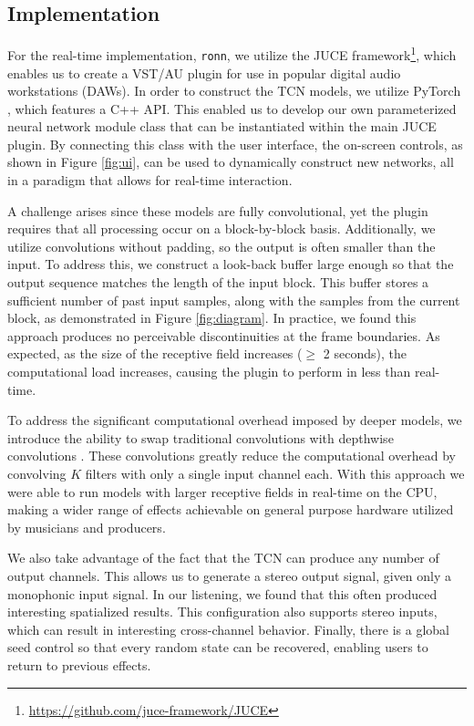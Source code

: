 \documentclass{article}
\begin{document}
\subsection{Implementation}
For the real-time implementation, \texttt{ronn}, we utilize the JUCE framework\footnote{\url{https://github.com/juce-framework/JUCE}},
which enables us to create a VST/AU plugin for use in popular digital audio workstations (DAWs).
In order to construct the TCN models, we utilize PyTorch \cite{pytorch}, which features a C++ API. 
This enabled us to develop our own parameterized neural network module class that can be instantiated within the main JUCE plugin.
By connecting this class with the user interface, the on-screen controls, as shown in Figure \ref{fig:ui},
can be used to dynamically construct new networks, all in a paradigm that allows for real-time interaction. 

A challenge arises since these models are fully convolutional,
yet the plugin requires that all processing occur on a block-by-block basis. 
Additionally, we utilize convolutions without padding, so the output is often smaller than the input. 
To address this, we construct a look-back buffer large enough so that the output sequence matches the length of the input block. 
This buffer stores a sufficient number of past input samples, along with the samples from the current block, as demonstrated in Figure \ref{fig:diagram}. 
In practice, we found this approach produces no perceivable discontinuities at the frame boundaries. 
As expected, as the size of the receptive field increases ($\geq$ 2 seconds), the computational load increases, 
causing the plugin to perform in less than real-time.

To address the significant computational overhead imposed by deeper models, 
we introduce the ability to swap traditional convolutions with depthwise convolutions \cite{howard2017mobilenets}.
These convolutions greatly reduce the computational overhead by convolving $K$ filters with only a single input channel each. 
With this approach we were able to run models with larger receptive fields in real-time on the CPU,
making a wider range of effects achievable on general purpose hardware utilized by musicians and producers. 

We also take advantage of the fact that the TCN can produce any number of output channels. 
This allows us to generate a stereo output signal, given only a monophonic input signal. 
In our listening, we found that this often produced interesting spatialized results. 
This configuration also supports stereo inputs, which can result in interesting cross-channel behavior. 
Finally, there is a global seed control so that every random state can be recovered, enabling users to return to previous effects.
\end{document}
